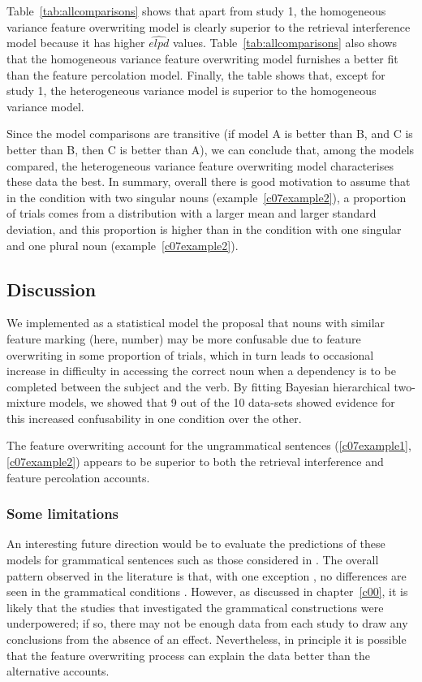 \documentclass{cambridge7A}\usepackage[]{graphicx}\usepackage[]{color}
\begin{document}
Table~\ref{tab:allcomparisons}  shows that 
apart from study 1, the homogeneous variance feature overwriting model is clearly superior to the retrieval interference model because it has higher $\widehat{elpd}$ values. 
Table~\ref{tab:allcomparisons} also shows that the homogeneous variance feature overwriting model furnishes a better fit than the feature percolation model. Finally, the table shows that, except for study 1, the heterogeneous variance model is superior to the homogeneous variance model.

Since the model comparisons are transitive (if model A is better than B, and C is better than B, then C is better than A), we can conclude that, among the models compared, the heterogeneous variance feature overwriting model characterises these data the best. 
In summary, overall there is good motivation to assume that in the
condition with two singular nouns (example~\ref{c07example2}), a proportion of trials comes from a distribution with a larger mean and larger standard deviation, and this proportion is higher than in the condition with one singular and one plural noun (example~\ref{c07example2}). 

\subsection{Discussion}

We implemented as a statistical model the proposal that nouns with similar feature marking (here, number) may be more confusable due to feature overwriting in some proportion of trials, which in turn leads to occasional increase in difficulty in accessing the correct noun when a dependency is to be completed between the subject and the verb. By fitting Bayesian hierarchical two-mixture models, we showed that 9 out of the 10 data-sets showed evidence for this increased confusability in one condition over the other. 

The feature overwriting account for the ungrammatical sentences (\ref{c07example1}, \ref{c07example2}) appears to be superior to both the retrieval interference and feature percolation accounts. 

\subsubsection{Some limitations}

An interesting future direction would be to evaluate the predictions of these models for grammatical sentences such as those considered in \cite{VillataFranck}. The overall pattern observed in the literature is that, with one exception \citep{nicenboimexploratory}, no differences are seen in the grammatical conditions \citep[see, e.g., the meta-analysis results reported in][]{JaegerEngelmannVasishth2017}. However, as discussed in chapter~\ref{c00}, it is likely that the studies that investigated the grammatical constructions were underpowered; if so, there may not be enough data from each study to draw any conclusions from the absence of an effect. Nevertheless, in principle it is possible that the feature overwriting process can explain the data better than the alternative accounts. 
\end{document}
